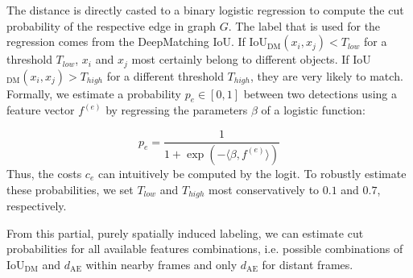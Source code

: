 The distance is directly casted to a binary logistic regression to compute the cut probability of the respective edge in graph $G$. 
The label that is used for the regression comes from the DeepMatching IoU. 
If IoU$_{\mathrm{DM}}(x_i,x_j)<T_{low}$ for a threshold $T_{low}$, $x_i$ and $x_j$ most certainly belong to different objects. 
If IoU$_{\mathrm{DM}}(x_i,x_j)>T_{high}$ for a different threshold $T_{high}$, they are very likely to match. 
Formally, we estimate a probability $p_e \in [0,1]$ between two detections using a feature vector $f^{(e)}$ by regressing the parameters $\beta$ of a logistic function:

\begin{equation} 
\label{eq:regression} p_e = \frac{1}{1+\exp(-\langle\beta, f^{(e)}\rangle)}
\end{equation} 
Thus, the costs $c_e$ can intuitively be computed by the logit. To robustly estimate these probabilities, we set $T_{low}$ and $T_{high}$ most conservatively to $0.1$ and $0.7$, respectively. 

From this partial, purely spatially induced labeling, we can estimate cut probabilities for all available features combinations, i.e. possible combinations of IoU$_\mathrm{DM}$ and $d_{\mathrm{AE}}$ within nearby frames and only $d_{\mathrm{AE}}$ for distant frames.